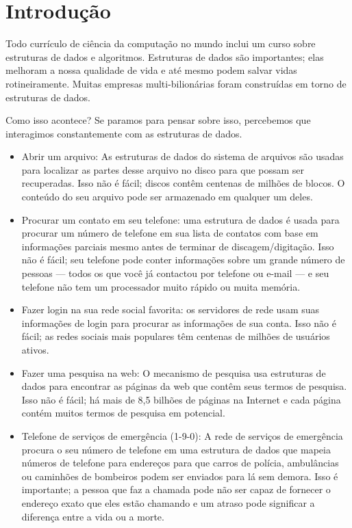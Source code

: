 \chapter{Introdução}

Todo currículo de ciência da computação no mundo inclui um curso sobre
estruturas de dados e algoritmos. Estruturas de dados são importantes; elas
melhoram a nossa qualidade de vida e até mesmo podem salvar vidas
rotineiramente. Muitas empresas multi-bilionárias foram construídas em torno de
estruturas de dados.

Como isso acontece? Se paramos para pensar sobre isso, percebemos que
interagimos constantemente com as estruturas de dados.
\begin{itemize}
	\item  Abrir um arquivo: As estruturas de dados do sistema de arquivos 
	são usadas para localizar as partes desse arquivo no disco para que possam ser
	recuperadas. Isso não é fácil; discos contêm centenas de milhões de blocos. O
	conteúdo do seu arquivo pode ser armazenado em qualquer um deles. 
	\item Procurar um contato em seu telefone: uma estrutura de dados é usada para
	procurar um número de telefone em sua lista de contatos 
	com base em informações parciais mesmo antes de terminar de discagem/digitação. Isso não é fácil; seu telefone pode conter informações sobre um
	grande número de pessoas --- todos os que você já contactou por telefone ou
	e-mail --- e seu telefone não tem um processador muito rápido ou muita memória.
	\item Fazer login na sua rede social 
	favorita: os servidores de rede usam suas informações de login para procurar as
	informações de sua conta. Isso não é fácil; as redes sociais mais populares têm
	centenas de milhões de usuários ativos.
	\item Fazer uma pesquisa na web:
	O mecanismo de pesquisa usa estruturas de dados para encontrar as páginas da
	web que contêm seus termos de pesquisa. Isso não é fácil; há mais de 8,5 bilhões
	de páginas na Internet e cada página contém muitos termos de pesquisa em
	potencial.
	\item Telefone de serviços de emergência (1-9-0): 
	A rede de serviços de emergência procura o seu número de telefone em uma
	estrutura de dados que mapeia números de telefone para endereços para que carros
	de polícia, ambulâncias ou caminhões de bombeiros podem ser enviados para lá sem
	demora. Isso é importante; a pessoa que faz a chamada pode não ser capaz de
	fornecer o endereço exato que eles estão chamando e um atraso pode significar a
	diferença entre a vida ou a morte.
\end{itemize}

